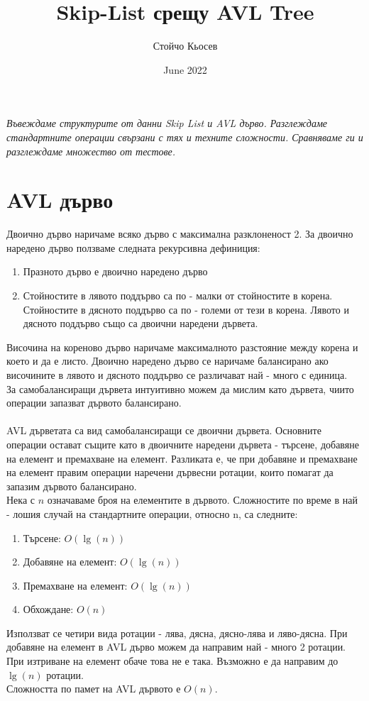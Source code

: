 \documentclass[a4paper,12pt,fleqn]{article}
\title{Skip-List срещу AVL Tree}
\author{Стойчо Кьосев}
\date{June 2022}
\begin{document}
	\maketitle
	\textit{Въвеждаме структурите от данни Skip List и AVL дърво. Разглеждаме стандартните операции свързани с тях и техните сложности. Сравняваме ги и разглеждаме множество от тестове.}
	
	\section{AVL дърво}
	Двоично дърво наричаме всяко дърво с максимална разклоненост 2.
	За двоично наредено дърво ползваме следната рекурсивна дефиниция:
	\begin{enumerate}
		\item Празното дърво е двоично наредено дърво
		\item Стойностите в лявото поддърво са по - малки от стойностите в корена. Стойностите в дясното поддърво са по - големи от тези в корена. Лявото и дясното поддърво също са двоични наредени дървета.
	\end{enumerate}
	Височина на кореново дърво наричаме максималното разстояние между корена и което и да е листо.
	Двоично наредено дърво се наричаме балансирано ако височините в лявото и дясното поддърво се различават най - много с единица.\\
	За самобалансиращи дървета интуитивно можем да мислим като дървета, чиито операции запазват дървото балансирано.\\
	\\AVL дърветата са вид самобалансиращи се двоични дървета. Основните операции остават същите като в двоичните наредени дървета - търсене, добавяне на елемент и премахване на елемент. Разликата е, че при добавяне и премахване на елемент правим операции наречени дървесни ротации, които помагат да запазим дървото балансирано. 
	\\Нека с $n$ означаваме броя на елементите в дървото. Сложностите по време в най - лошия случай на стандартните операции, относно n, са следните:
	\begin{enumerate}
		\item Търсене: $O(\lg(n))$
		\item Добавяне на елемент: $O(\lg(n))$
		\item Премахване на елемент: $O(\lg(n))$
		\item Обхождане: $O(n)$
	\end{enumerate}
	Използват се четири вида ротации - лява, дясна, дясно-лява и ляво-дясна. При добавяне на елемент в AVL дърво можем да направим най - много 2 ротации. При изтриване на елемент обаче това не е така. Възможно е да направим до $\lg(n)$ ротации.\\
	Сложността по памет на AVL дървото е $O(n)$.
\end{document}
